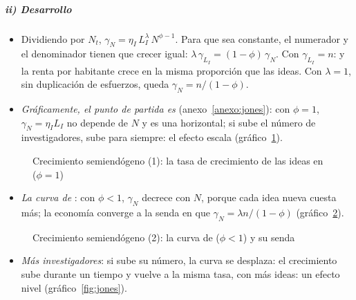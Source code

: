 \documentclass[11pt]{article}
\begin{document}
\subparagraph{ii) Desarrollo}

\begin{itemize}
\item Dividiendo por $N_t$, $\gamma_N=\eta_I\,L_I^{\lambda}\,N^{\phi-1}$. Para que sea constante, el numerador y el denominador tienen que crecer igual: $\lambda\,\gamma_{L_I}=(1-\phi)\,\gamma_N$. Con $\gamma_{L_I}=n$:
  y la renta por habitante crece en la misma proporción que las ideas. Con $\lambda=1$, sin duplicación de esfuerzos, queda $\gamma_N=n/(1-\phi)$.
\item \emph{Gráficamente, el punto de partida es } (anexo~\ref{anexo:jones}): con $\phi=1$, $\gamma_N=\eta_IL_I$ no depende de $N$ y es una horizontal; si sube el número de investigadores, sube para siempre: el efecto escala (gráfico~\ref{fig:jones-1}).
\end{itemize}

\begin{figure}[H]
\centering
\caption{Crecimiento semiendógeno (1): la tasa de crecimiento de las ideas en  ($\phi=1$)}\label{fig:jones-1}
\end{figure}

\begin{itemize}
\item \emph{La curva de }: con $\phi<1$, $\gamma_N$ decrece con $N$, porque cada idea nueva cuesta más; la economía converge a la senda en que $\gamma_N=\lambda n/(1-\phi)$ (gráfico~\ref{fig:jones-2}).
\end{itemize}

\begin{figure}[H]
\centering
\caption{Crecimiento semiendógeno (2): la curva de  ($\phi<1$) y su senda}\label{fig:jones-2}
\end{figure}

\begin{itemize}
\item \emph{Más investigadores}: si sube su número, la curva se desplaza: el crecimiento sube durante un tiempo y vuelve a la misma tasa, con más ideas: un efecto nivel (gráfico~\ref{fig:jones}).
\end{itemize}
\end{document}
